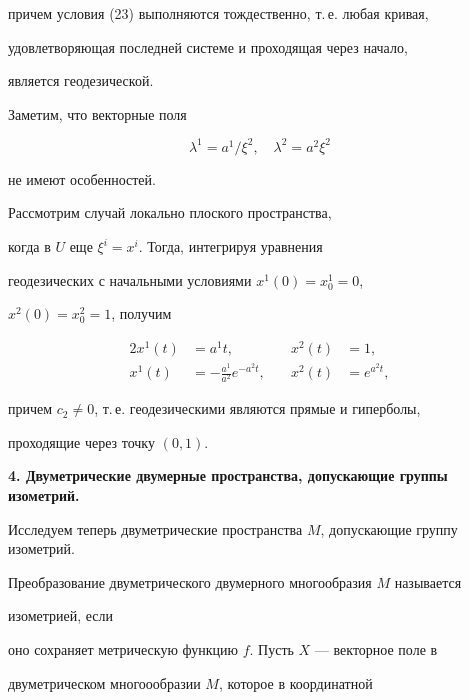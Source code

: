 причем условия (23) выполняются тождественно, т.\,е. любая кривая,


удовлетворяющая последней системе и проходящая через начало,


является геодезической.


Заметим, что векторные поля


$$


\lambda^1=a^1/\xi^2,\quad


\lambda^2=a^2\xi^2


$$


не имеют особенностей.





Рассмотрим случай локально плоского пространства,


когда в $U$ еще $\xi^i=x^i$. Тогда, интегрируя уравнения


геодезических с начальными условиями $x^1(0)=x^1_0=0$,


$x^2(0)=x^2_0=1$, получим


\begin{alignat*}{2}


x^1(t)&=a^1t, &\quad x^2(t)&=1, \\


x^1(t)&=- \frac{a^1}{a^2}e^{-a^2t}, &\quad 


x^2(t)&=e^{a^2t},


\end{alignat*}


причем $c_2\neq 0$, т.\,е. геодезическими являются прямые и гиперболы,


проходящие через точку $(0,1)$.


\medskip











{\bf 4. Двуметрические двумерные пространства, допускающие группы изометрий.}


Исследуем теперь двуметрические пространства $M$, допускающие группу изометрий.


Преобразование двуметрического двумерного многообразия $M$ называется 


изометрией, если


оно сохраняет метрическую функцию $f$. Пусть $X$ --- векторное поле в


двуметрическом многоообразии $M$, которое в координатной


